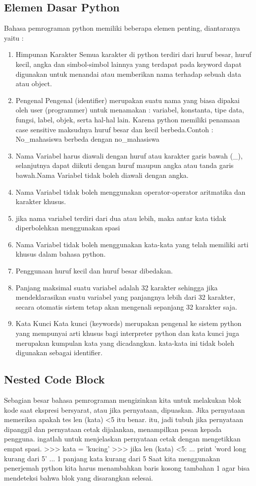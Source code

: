 \subsection{Elemen Dasar Python}
Bahasa pemrograman python memiliki beberapa elemen penting, diantaranya yaitu :
\begin{enumerate}
	\item Himpunan Karakter
		Semua karakter di python terdiri dari huruf besar, huruf kecil, angka dan simbol-simbol lainnya yang terdapat pada keyword dapat digunakan untuk menandai atau memberikan nama terhadap sebuah data atau object.
	\item Pengenal 
		Pengenal (identifier) merupakan suatu nama yang biasa dipakai oleh user (programmer) untuk menamakan : variabel, konstanta, tipe data, fungsi, label, objek, serta hal-hal lain. Karena python memiliki penamaan case sensitive maksudnya huruf besar dan kecil berbeda.Contoh : No_mahasiswa berbeda dengan no_mahasiswa
	\item Nama Variabel harus diawali dengan huruf atau karakter garis bawah (_), selanjutnya dapat diikuti dengan huruf maupun angka atau tanda garis bawah.Nama Variabel tidak boleh diawali dengan angka.
	\item Nama Variabel tidak boleh menggunakan operator-operator aritmatika dan karakter khusus.
	\item jika nama variabel terdiri dari dua atau lebih, maka antar kata tidak diperbolehkan menggunakan spasi
	\item Nama Variabel tidak boleh menggunakan kata-kata yang telah memiliki arti khusus dalam bahasa python.
	\item Penggunaan huruf kecil dan huruf besar dibedakan.
	\item Panjang maksimal suatu variabel adalah 32 karakter sehingga jika mendeklarasikan suatu variabel yang panjangnya lebih dari 32 karakter, secara otomatis sistem tetap akan mengenali sepanjang 32 karakter saja.
	\item Kata Kunci
		Kata kunci (keywords) merupakan pengenal ke sistem python yang mempunyai arti khusus bagi interpreter python dan kata kunci juga merupakan kumpulan kata yang dicadangkan. kata-kata ini tidak boleh digunakan sebagai identifier.
\end{enumerate}

\subsection {Nested Code Block}
Sebagian besar bahasa pemrograman mengizinkan kita untuk melakukan blok kode saat ekspresi bersyarat, atau jika pernyataan, dipuaskan.
Jika pernyataan memeriksa apakah tes len (kata) <5 itu benar. itu, jadi tubuh jika pernyataan dipanggil dan pernyataan cetak dijalankan, menampilkan pesan kepada pengguna. ingatlah untuk menjelaskan pernyataan cetak dengan mengetikkan empat spasi.
>>> kata = 'kucing'
>>> jika len (kata) <5:
... print 'word long kurang dari 5'
... 1
panjang kata kurang dari 5
Saat kita menggunakan penerjemah python kita harus menambahkan baris kosong tambahan 1 agar bisa mendeteksi bahwa blok yang disarangkan selesai.
